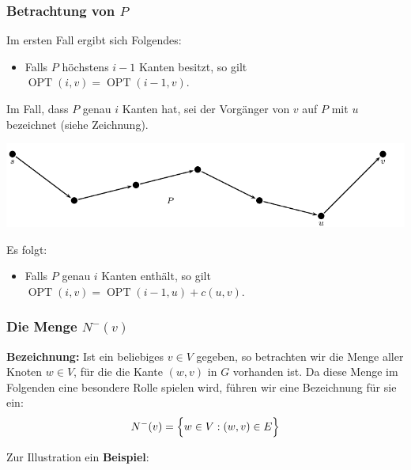 \documentclass[smaller,xcolor=dvipsnames]{beamer}
\DeclareMathOperator{\opt}{OPT}
\begin{document}
\begin{frame}
\frametitle{Betrachtung von $P$}
 Im ersten Fall ergibt sich Folgendes:
\begin{itemize}
\item \alert{Falls $P$ höchstens $i-1$ Kanten besitzt,} so gilt $\opt{(i,v)} = \opt{(i-1,v)}$.
\end{itemize} \medskip

 Im Fall, dass $P$ genau $i$ Kanten hat, sei der Vorgänger von $v$ auf $P$ mit $u$ bezeichnet (siehe Zeichnung).

\begin{center}
 \includegraphics{fig97.pdf}
\end{center}

Es folgt:
\begin{itemize}
\item \alert{Falls $P$ genau $i$ Kanten enthält,} so gilt $\opt{(i,v)} = \opt{(i-1,u)} + c(u,v)$.
\end{itemize}
\end{frame}

\begin{frame}
\frametitle{Die Menge $N^-(v)$}
 \textbf{Bezeichnung:} Ist ein beliebiges $v \in V$ gegeben, so betrachten wir \alert{die Menge aller Knoten $w \in V$, für die die Kante $(w,v)$ in $G$ vorhanden ist.} Da diese Menge im Folgenden eine besondere Rolle spielen wird, führen wir eine Bezeichnung für sie ein:
\[
N^-(v) = \Bigl\{ w \in V : (w,v) \in E \Bigr\}
\] \medskip

Zur Illustration ein \textbf{Beispiel}:
\end{frame}
\end{document}

